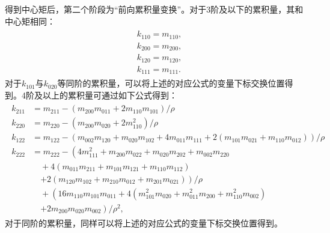 得到中心矩后，第二个阶段为“前向累积量变换”。对于3阶及以下的累积量，其和中心矩相同：
\begin{align}
    \begin{split}
& k_{110}=m_{110}, \\
& k_{200}=m_{200}, \\
& k_{120}=m_{120}, \\
& k_{111}=m_{111} .
\end{split}
\end{align}
对于$k_{101}$与$k_{020}$等同阶的累积量，可以将上述的对应公式的变量下标交换位置得到。4阶及以上的累积量可通过如下公式得到：
\begin{align}
    \begin{split}
k_{211} & =m_{211}-\left(m_{200} m_{011}+2 m_{110} m_{101}\right) / \rho \\
k_{220} & =m_{220}-\left(m_{200} m_{020}+2 m_{110}^{2}\right) / \rho \\
k_{122} & =m_{122}-\left(m_{002} m_{120}+m_{020} m_{102}+4 m_{011} m_{111}+2\left(m_{101} m_{021}+m_{110} m_{012}\right)\right) / \rho \\
k_{222} & =m_{222}-\left(4 m_{111}^{2}+m_{200} m_{022}+m_{020} m_{202}+m_{002} m_{220}\right. \\
&\quad +4\left(m_{011} m_{211}+m_{101} m_{121}+m_{110} m_{112}\right) \\
&\quad \left.+2\left(m_{120} m_{102}+m_{210} m_{012}+m_{201} m_{021}\right)\right) / \rho \\
&\quad +\left(16 m_{110} m_{101} m_{011}+4\left(m_{101}^{2} m_{020}+m_{011}^{2} m_{200}+m_{110}^{2} m_{002}\right)\right. \\
&\quad \left.+2 m_{200} m_{020} m_{002}\right) / \rho^{2} ,
\end{split}
\end{align}
对于同阶的累积量，同样可以将上述的对应公式的变量下标交换位置得到。


